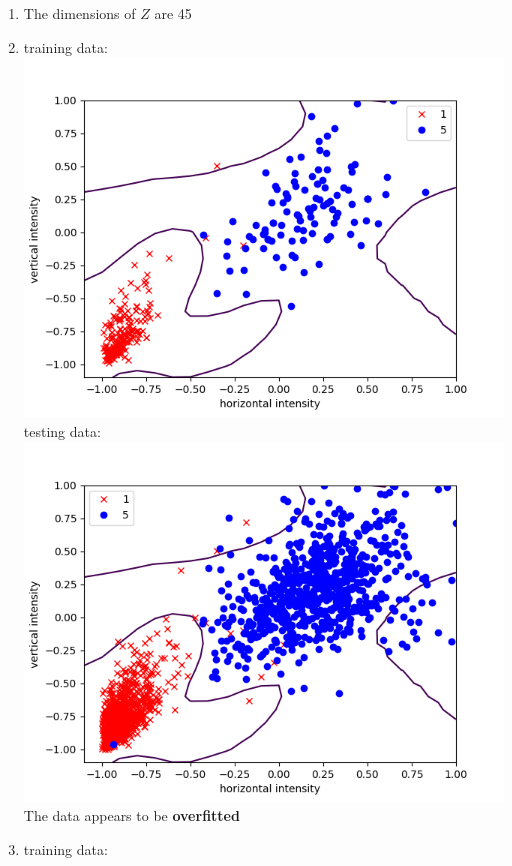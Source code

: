 \documentclass{article}
\begin{document}
    \begin{enumerate}
        \item The dimensions of $Z$ are 45
        \item training data:\\
        \includegraphics[scale=0.5]{images/reg0train.png}\\
        testing data:\\
        \includegraphics[scale=0.5]{images/reg0test.png}\\
        The data appears to be \textbf{overfitted}
        \item training data:\\

\end{enumerate}
\end{document}

